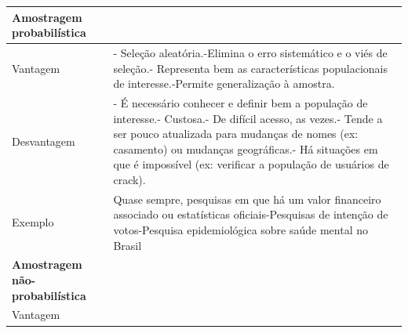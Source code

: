 \documentclass[
]{book}
\begin{document}
\begin{longtable}[]{@{}ll@{}}
\toprule
\begin{minipage}[b]{0.43\columnwidth}\raggedright
Amostragem probabilística\strut
\end{minipage} & \begin{minipage}[b]{0.51\columnwidth}\raggedright
\strut
\end{minipage}\tabularnewline
\midrule
\endhead
\begin{minipage}[t]{0.43\columnwidth}\raggedright
Vantagem\strut
\end{minipage} & \begin{minipage}[t]{0.51\columnwidth}\raggedright
- Seleção aleatória.-Elimina o erro sistemático e o viés de seleção.-
Representa bem as características populacionais de interesse.-Permite
generalização à amostra.\strut
\end{minipage}\tabularnewline
\begin{minipage}[t]{0.43\columnwidth}\raggedright
Desvantagem\strut
\end{minipage} & \begin{minipage}[t]{0.51\columnwidth}\raggedright
- É necessário conhecer e definir bem a população de interesse.-
Custosa.- De difícil acesso, as vezes.- Tende a ser pouco atualizada
para mudanças de nomes (ex: casamento) ou mudanças geográficas.- Há
situações em que é impossível (ex: verificar a população de usuários de
crack).\strut
\end{minipage}\tabularnewline
\begin{minipage}[t]{0.43\columnwidth}\raggedright
Exemplo\strut
\end{minipage} & \begin{minipage}[t]{0.51\columnwidth}\raggedright
Quase sempre, pesquisas em que há um valor financeiro associado ou
estatísticas oficiais-Pesquisas de intenção de votos-Pesquisa
epidemiológica sobre saúde mental no Brasil\strut
\end{minipage}\tabularnewline
\begin{minipage}[t]{0.43\columnwidth}\raggedright
\textbf{Amostragem não-probabilística}\strut
\end{minipage} & \begin{minipage}[t]{0.51\columnwidth}\raggedright
\strut
\end{minipage}\tabularnewline
\begin{minipage}[t]{0.43\columnwidth}\raggedright
Vantagem\strut
\end{minipage} & \begin{minipage}[t]{0.51\columnwidth}\raggedright

\end{minipage}
\end{longtable}
\end{document}
